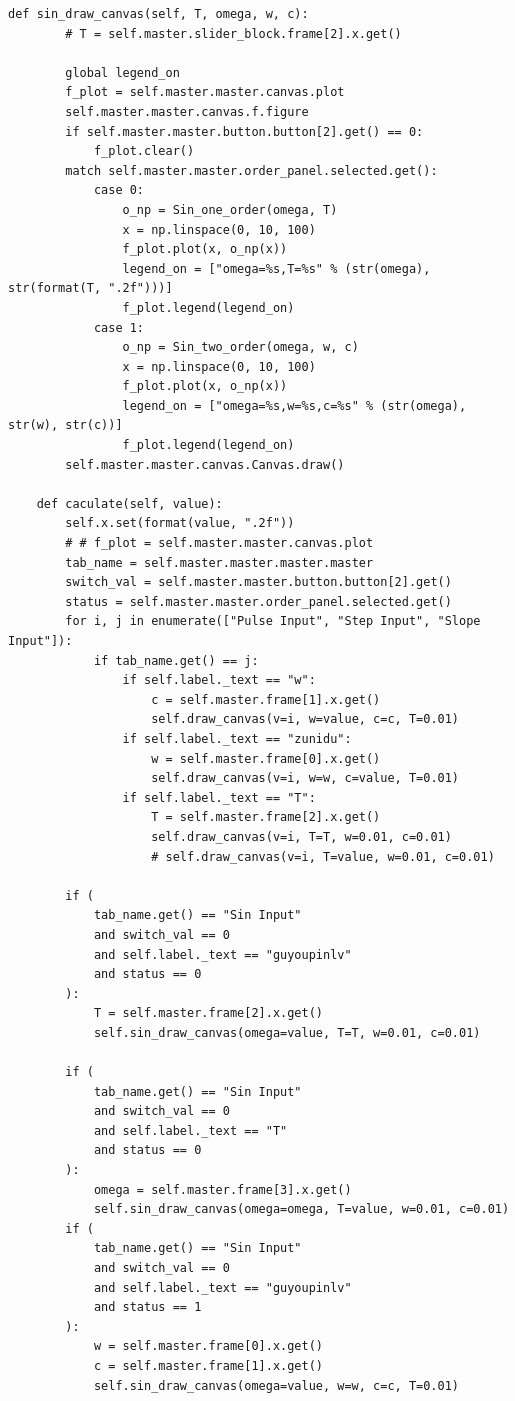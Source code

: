 \documentclass[12pt]{ctexart}
\begin{document}
\begin{lstlisting}[title=MySliderBlock 类代码]
    def sin_draw_canvas(self, T, omega, w, c):
        # T = self.master.slider_block.frame[2].x.get()

        global legend_on
        f_plot = self.master.master.canvas.plot
        self.master.master.canvas.f.figure
        if self.master.master.button.button[2].get() == 0:
            f_plot.clear()
        match self.master.master.order_panel.selected.get():
            case 0:
                o_np = Sin_one_order(omega, T)
                x = np.linspace(0, 10, 100)
                f_plot.plot(x, o_np(x))
                legend_on = ["omega=%s,T=%s" % (str(omega), str(format(T, ".2f")))]
                f_plot.legend(legend_on)
            case 1:
                o_np = Sin_two_order(omega, w, c)
                x = np.linspace(0, 10, 100)
                f_plot.plot(x, o_np(x))
                legend_on = ["omega=%s,w=%s,c=%s" % (str(omega), str(w), str(c))]
                f_plot.legend(legend_on)
        self.master.master.canvas.Canvas.draw()

    def caculate(self, value):
        self.x.set(format(value, ".2f"))
        # # f_plot = self.master.master.canvas.plot
        tab_name = self.master.master.master.master
        switch_val = self.master.master.button.button[2].get()
        status = self.master.master.order_panel.selected.get()
        for i, j in enumerate(["Pulse Input", "Step Input", "Slope Input"]):
            if tab_name.get() == j:
                if self.label._text == "w":
                    c = self.master.frame[1].x.get()
                    self.draw_canvas(v=i, w=value, c=c, T=0.01)
                if self.label._text == "zunidu":
                    w = self.master.frame[0].x.get()
                    self.draw_canvas(v=i, w=w, c=value, T=0.01)
                if self.label._text == "T":
                    T = self.master.frame[2].x.get()
                    self.draw_canvas(v=i, T=T, w=0.01, c=0.01)
                    # self.draw_canvas(v=i, T=value, w=0.01, c=0.01)

        if (
            tab_name.get() == "Sin Input"
            and switch_val == 0
            and self.label._text == "guyoupinlv"
            and status == 0
        ):
            T = self.master.frame[2].x.get()
            self.sin_draw_canvas(omega=value, T=T, w=0.01, c=0.01)

        if (
            tab_name.get() == "Sin Input"
            and switch_val == 0
            and self.label._text == "T"
            and status == 0
        ):
            omega = self.master.frame[3].x.get()
            self.sin_draw_canvas(omega=omega, T=value, w=0.01, c=0.01)
        if (
            tab_name.get() == "Sin Input"
            and switch_val == 0
            and self.label._text == "guyoupinlv"
            and status == 1
        ):
            w = self.master.frame[0].x.get()
            c = self.master.frame[1].x.get()
            self.sin_draw_canvas(omega=value, w=w, c=c, T=0.01)


\end{lstlisting}
\end{document}
